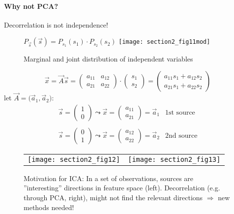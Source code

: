 \paragraph{Why not PCA?} Decorrelation is not independence!

\begin{figure}[h]
  \centering
$P_{\vec{s}}(\vec{s})=P_{s_1}(s_1)\cdot P_{s_2}(s_2)$
\texttt{[image: section2\_fig11mod]}  
  \caption{Marginal and joint distribution of independent variables}
  \label{fig:jointMarginal}
\end{figure}


\begin{equation}
	\vec{x} = \vec{A} \vec{s} = \left( \begin{array}{ll}
			a_{11} & a_{12} \\ a_{21} & a_{22}
		\end{array} \right) \cdot \left( \begin{array}{ll}
			s_1 \\ s_2
		\end{array} \right)
	= \left( \begin{array}{l}
		a_{11} s_1 + a_{12} s_2 \\ a_{21} s_1 + a_{22} s_2
	\end{array} \right)
\end{equation}
let $\vec{A} = \big( \vec{a}_1, \vec{a}_2 \big)$:
\begin{equation}
	\begin{array}{ll}
	\vec{s} = \left( \begin{array}{l} 1 \\ 0 \end{array} \right) 
		\leadsto \vec{x} = \left( \begin{array}{l} 
		a_{11} \\ a_{21} \end{array} \right) = \vec{a}_1
		& \text{1st source} 
		\\\\
	\vec{s} = \left( \begin{array}{l} 0 \\ 1 \end{array} \right) 
		\leadsto \vec{x} = \left( \begin{array}{l} 
		a_{12} \\ a_{22} \end{array} \right) = \vec{a}_2
		& \text{2nd source}
	\end{array}
\end{equation}
\begin{figure}[h]
  \centering
  \begin{tabular}{c c}
  \texttt{[image: section2\_fig12]}  &     
  \texttt{[image: section2\_fig13]}
  \end{tabular}
  \caption{Motivation for ICA: In a set of observations, sources are ''interesting'' directions in feature space
    (left). Decorrelation (e.g. through PCA, right), might not find the relevant directions $\Rightarrow$ new  methods needed!}

  \label{fig:icaExample1}
\end{figure}



